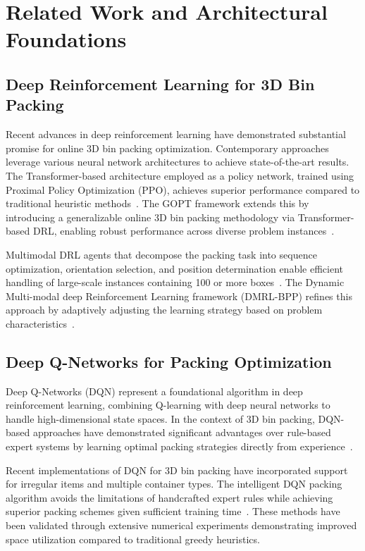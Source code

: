 \documentclass[12pt]{article}
\begin{document}
\section{Related Work and Architectural Foundations}

\subsection{Deep Reinforcement Learning for 3D Bin Packing}

Recent advances in deep reinforcement learning have demonstrated substantial promise for online 3D bin packing optimization. Contemporary approaches leverage various neural network architectures to achieve state-of-the-art results. The Transformer-based architecture employed as a policy network, trained using Proximal Policy Optimization (PPO), achieves superior performance compared to traditional heuristic methods~\cite{transformer_packing2023}. The GOPT framework extends this by introducing a generalizable online 3D bin packing methodology via Transformer-based DRL, enabling robust performance across diverse problem instances~\cite{gopt2024}.

Multimodal DRL agents that decompose the packing task into sequence optimization, orientation selection, and position determination enable efficient handling of large-scale instances containing 100 or more boxes~\cite{multimodal_drl2024}. The Dynamic Multi-modal deep Reinforcement Learning framework (DMRL-BPP) refines this approach by adaptively adjusting the learning strategy based on problem characteristics~\cite{dmrl_bpp2024}.

\subsection{Deep Q-Networks for Packing Optimization}

Deep Q-Networks (DQN) represent a foundational algorithm in deep reinforcement learning, combining Q-learning with deep neural networks to handle high-dimensional state spaces. In the context of 3D bin packing, DQN-based approaches have demonstrated significant advantages over rule-based expert systems by learning optimal packing strategies directly from experience~\cite{dqn_irregular2023}.

Recent implementations of DQN for 3D bin packing have incorporated support for irregular items and multiple container types. The intelligent DQN packing algorithm avoids the limitations of handcrafted expert rules while achieving superior packing schemes given sufficient training time~\cite{dqn_irregular2023}. These methods have been validated through extensive numerical experiments demonstrating improved space utilization compared to traditional greedy heuristics.
\end{document}
